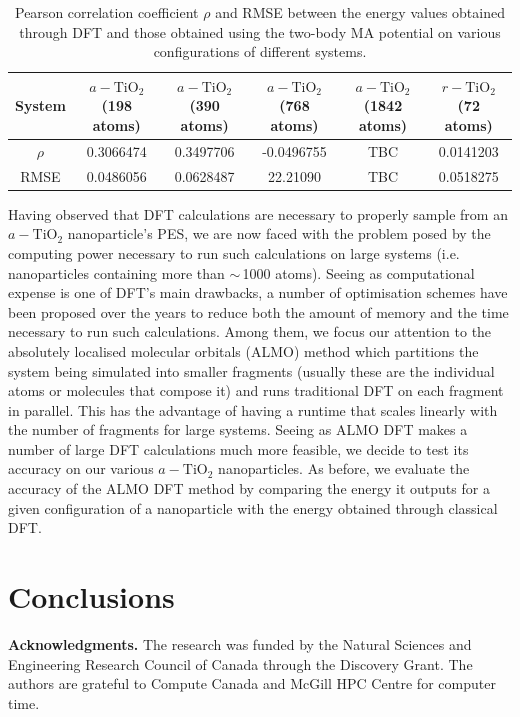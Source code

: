 \documentclass[aps,prb,twocolumn,amsmath,amssymb,superscriptaddress,longbibliography]{revtex4-1}
\newcommand\tab[1][1cm]{\hspace*{#1}} %
\begin{document}
\begin{table}[]
\begin{tabular}{c|c|c|c|c|c}
System & $a-\text{TiO}_2$ (198 atoms) & $a-\text{TiO}_2$ (390 atoms) & $a-\text{TiO}_2$ (768 atoms) & $a-\text{TiO}_2$ (1842 atoms) & $r-\text{TiO}_2$ (72 atoms) \\ \hline
$\rho$ & 0.3066474                    & 0.3497706                    & -0.0496755                   & TBC                           & 0.0141203                   \\
RMSE   & 0.0486056                    & 0.0628487                    & 22.21090                     & TBC                           & 0.0518275                   \\
\end{tabular}
\label{stats}
\caption{Pearson correlation coefficient $\rho$ and RMSE between the energy values obtained through DFT and those obtained using the two-body MA potential on various configurations of different systems.}
\end{table}

\tab Having observed that DFT calculations are necessary to properly sample from an $a-\text{TiO}_2$ nanoparticle's PES, we are now faced with the problem posed by the computing power necessary to run such calculations on large systems (i.e. nanoparticles containing more than $\sim\,$1000 atoms).
Seeing as computational expense is one of DFT's main drawbacks, a number of optimisation schemes have been proposed over the years to reduce both the amount of memory and the time necessary to run such calculations.
Among them, we focus our attention to the absolutely localised molecular orbitals (ALMO) method which partitions the system being simulated into smaller fragments (usually these are the individual atoms or molecules that compose it) and runs traditional DFT on each fragment in parallel.
This has the advantage of having a runtime that scales linearly with the number of fragments for large systems.
Seeing as ALMO DFT makes a number of large DFT calculations much more feasible, we decide to test its accuracy on our various $a-\text{TiO}_2$ nanoparticles.
As before, we evaluate the accuracy of the ALMO DFT method by comparing the energy it outputs for a given configuration of a nanoparticle with the energy obtained through classical DFT.  

\section*{Conclusions} 



\textbf{Acknowledgments.} The research was funded by the Natural Sciences and Engineering Research Council of Canada through the Discovery Grant. The authors are grateful to Compute Canada and McGill HPC Centre for computer time.



\end{document}
